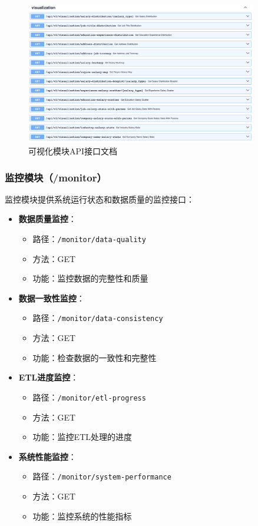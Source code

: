 \begin{figure}[htbp]
    \centering
    \includegraphics[width=0.9\textwidth]{figures/visualization_api.png}
    \caption{可视化模块API接口文档}
    \label{fig:visualization_api}
\end{figure}

\subsubsection{监控模块（/monitor）}
监控模块提供系统运行状态和数据质量的监控接口：

\begin{itemize}
    \item \textbf{数据质量监控}：
    \begin{itemize}
        \item 路径：\texttt{/monitor/data-quality}
        \item 方法：GET
        \item 功能：监控数据的完整性和质量
    \end{itemize}
    
    \item \textbf{数据一致性监控}：
    \begin{itemize}
        \item 路径：\texttt{/monitor/data-consistency}
        \item 方法：GET
        \item 功能：检查数据的一致性和完整性
    \end{itemize}
    
    \item \textbf{ETL进度监控}：
    \begin{itemize}
        \item 路径：\texttt{/monitor/etl-progress}
        \item 方法：GET
        \item 功能：监控ETL处理的进度
    \end{itemize}
    
    \item \textbf{系统性能监控}：
    \begin{itemize}
        \item 路径：\texttt{/monitor/system-performance}
        \item 方法：GET
        \item 功能：监控系统的性能指标
    \end{itemize}
\end{itemize}


